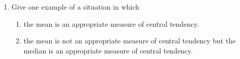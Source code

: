 \renewcommand{\theequation}{\theenumi}
\begin{enumerate}[label=\thesection.\arabic*.,ref=\thesection.\theenumi]
\item Give one example of a situation in which
\begin{enumerate}
\item the mean is an appropriate measure of
central tendency.
\item the mean is not an appropriate measure
of central tendency but the median is an
appropriate measure of central tendency.
\end{enumerate}
\end{enumerate}